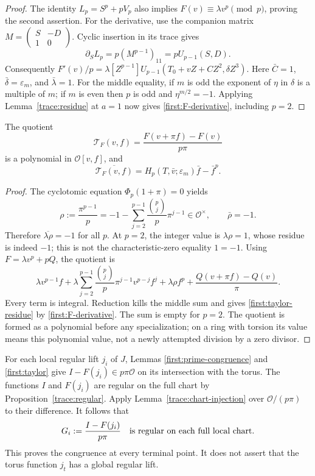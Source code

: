 \begin{proof}
The identity $L_p=S^p+pV_p$ also implies
$F(v)\equiv\lambda v^p\pmod p$, proving the second assertion.
For the derivative, use the companion matrix
$M=\left(\begin{smallmatrix}S&-D\\1&0\end{smallmatrix}\right)$.
Cyclic insertion in its trace gives
\[
 \partial_S L_p=p(M^{p-1})_{11}=pU_{p-1}(S,D).
\]
Consequently
$F'(v)/p=\lambda[Z^{p-1}]U_{p-1}(T_0+vZ+CZ^2,\delta Z^3)$.
Here $\bar C=1$, $\bar\delta=\varepsilon_m$, and $\bar\lambda=1$.
For the middle equality, if $m$ is odd the exponent of $\eta$ in
$\delta$ is a multiple of $m$; if $m$ is even then $p$ is odd and
$\eta^{m/2}=-1$. Applying Lemma~\ref{trace:residue} at $a=1$
now gives \eqref{first:F-derivative}, including $p=2$.
\end{proof}

\begin{lemma}
\label{first:taylor}
The quotient
\[
 \mathcal T_F(v,f)=\frac{F(v+\pi f)-F(v)}{p\pi}
\]
is a polynomial in $\mathcal O[v,f]$, and
\begin{equation}
 \overline{\mathcal T_F(v,f)}
 =H_p(T,\bar v;\varepsilon_m)\bar f-\bar f^p.
 \label{first:taylor-residue}
\end{equation}
\end{lemma}

\begin{proof}
The cyclotomic equation $\Phi_p(1+\pi)=0$ yields
\[
 \rho:=\frac{\pi^{p-1}}p
 =-1-\sum_{j=2}^{p-1}\frac{\binom pj}{p}\pi^{j-1}
 \in\mathcal O^\times,
 \qquad \bar\rho=-1.
\]
Therefore $\overline{\lambda\rho}=-1$ for all $p$.
At $p=2$, the integer value is $\lambda\rho=1$, whose residue is
indeed $-1$; this is not the characteristic-zero equality $1=-1$.
Using $F=\lambda v^p+pQ$, the quotient is
\[
 \lambda v^{p-1}f+
 \lambda\sum_{j=2}^{p-1}\frac{\binom pj}{p}\pi^{j-1}v^{p-j}f^j
 +\lambda\rho f^p+\frac{Q(v+\pi f)-Q(v)}\pi.
\]
Every term is integral. Reduction kills the middle sum and gives
\eqref{first:taylor-residue} by \eqref{first:F-derivative}.
The sum is empty for $p=2$. The quotient is formed as a polynomial
before any specialization; on a ring with torsion its value means this
polynomial value, not a newly attempted division by a zero divisor.
\end{proof}

For each local regular lift $j_i$ of $J$, Lemmas
\ref{first:prime-congruence} and \ref{first:taylor} give
$I-F(j_i)\in p\pi\mathcal O$ on its intersection with the torus.
The functions $I$ and $F(j_i)$ are regular on the full chart by
Proposition~\ref{trace:regular}. Apply Lemma~\ref{trace:chart-injection}
over $\mathcal O/(p\pi)$ to their difference. It follows that
\begin{equation}
 G_i:=\frac{I-F(j_i)}{p\pi}
 \quad\hbox{is regular on each full local chart.}
 \label{first:Gi}
\end{equation}
This proves the congruence at every terminal point. It does not assert
that the torus function $j_t$ has a global regular lift.


